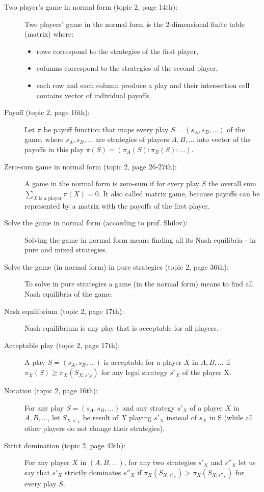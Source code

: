 \documentclass[
	a4paper, %
	11pt, %
]{CSUniSchoolLabReport}
\begin{document}
\begin{description}
    \item[Two player's game in normal form (topic 2, page 14th):] Two players' game in the normal form is the 2-dimensional finite table (matrix) where:
    \begin{itemize}
        \item rows correspond to the strategies of the first player,
        \item columns correspond to the strategies of the second player,
        \item each row and each column produce a play and their intersection
cell contains vector of individual payoffs.
    \end{itemize}
    \item[Payoff (topic 2, page 16th):] Let $\pi$ be payoff function that maps every play $S = (s_A, s_B, ...)$ of the game, where $s_A, s_B, ...$ are strategies of players $A, B, ...$ into vector of the payoffs in this play $\pi(S) = (\pi_A(S):\pi_B(S):...)$.
    \item[Zero-sum game in normal form (topic 2, page 26-27th):] A game in the normal form is zero-sum if for every play $S$ the overall sum $\sum_{X \text{ is a player}}{\pi(X)} = 0$. It also called matrix game, because payoffs can be represented by a matrix with the payoffs of the first player.
    \item[Solve the game in normal form (according to prof. Shilov):] Solving the game in normal form means finding all its Nash equilibria - in pure and mixed strategies.
    \item[Solve the game (in normal form) in pure strategies (topic 2, page 36th):] To solve in pure strategies a game (in the normal form) means to find all Nash equilibria of the game.
    \item[Nash equilibrium (topic 2, page 17th):] Nash equilibrium is any play that is acceptable for all players.
    \item[Acceptable play (topic 2, page 17th):] A play $S = (s_A, s_B, ...)$ is acceptable for a player $X$ in $A, B, ...$ if $\pi_X(S) \geq \pi_X(S_{X:s'_X})$ for any legal strategy $s'_X$ of the player X.
    \item[Notation (topic 2, page 16th):] For any play $S = (s_A, s_B, ...)$ and any strategy $s'_X$ of a player $X$ in $A, B, ...$, let $S_{X:s'_X}$ be result of $X$ playing $s'_X$ instead of $s_X$ in S (while all other players do not change their strategies).
    \item[Strict domination (topic 2, page 43th):] For any player $X$ in $(A, B, ...)$, for any two strategies $s'_X$ and $s''_X$ let us say that $s'_X$ strictly dominates $s''_X$ if $\pi_X(S_{X:s'_X}) >  \pi_X(S_{X:s''_X})$ for every play $S$.

\end{description}
\end{document}
